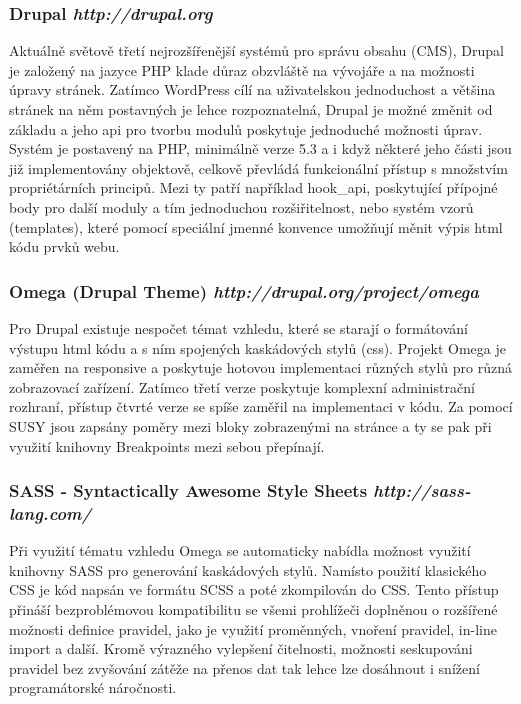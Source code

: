 \subsubsection*{Drupal \hfill \emph{http://drupal.org}} 
Aktuálně světově třetí nejrozšířenější\cite{website:cms-market-share} systémů pro správu obsahu (CMS), Drupal je založený na jazyce PHP klade důraz obzvláště na vývojáře a na možnosti úpravy stránek. Zatímco WordPress cílí na uživatelskou jednoduchost a většina stránek na něm postavných je lehce rozpoznatelná, Drupal je možné změnit od základu a jeho \gls{api} pro tvorbu modulů poskytuje jednoduché možnosti úprav. Systém je postavený na PHP, minimálně verze 5.3 a i když některé jeho části jsou již implementovány objektově, celkově převládá funkcionální přístup s množstvím propriétárních principů. Mezi ty patří například hook\_api, poskytující přípojné body pro další moduly a tím jednoduchou rozšiřitelnost, nebo systém vzorů (templates), které pomocí speciální jmenné konvence umožňují měnit výpis html kódu prvků webu.

\subsubsection*{Omega (Drupal Theme) \hfill \emph{http://drupal.org/project/omega}}
Pro Drupal existuje nespočet témat vzhledu, které se starají o formátování výstupu html kódu a s ním spojených kaskádových stylů (css). Projekt Omega je zaměřen na \gls{responsive} a poskytuje hotovou implementaci různých stylů pro různá zobrazovací zařízení. Zatímco třetí verze poskytuje komplexní administrační rozhraní, přístup čtvrté verze se spíše zaměřil na implementaci v kódu. Za pomocí SUSY jsou zapsány poměry mezi bloky zobrazenými na stránce a ty se pak při využití knihovny Breakpoints\cite{website:breakpoints} mezi sebou přepínají.

\subsubsection*{SASS - Syntactically Awesome Style Sheets \hfill \emph{http://sass-lang.com/}}
Při využití tématu vzhledu Omega se automaticky nabídla možnost využití knihovny SASS pro generování kaskádových stylů. Namísto použití klasického CSS je kód napsán ve formátu SCSS a poté zkompilován do CSS. Tento přístup přináší bezproblémovou kompatibilitu se všemi prohlížeči doplněnou o rozšířené možnosti definice pravidel, jako je využití proměnných, vnoření pravidel, in-line import a další. Kromě výrazného vylepšení čitelnosti, možnosti seskupováni pravidel bez zvyšování zátěže na přenos dat tak lehce lze dosáhnout i snížení programátorské náročnosti.

